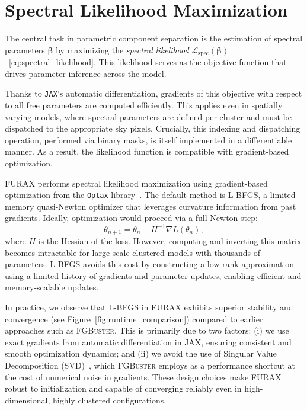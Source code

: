 \documentclass[%
 reprint,
bibnotes,
 amsmath,amssymb,
 aps,
floatfix, 
]{revtex4-2}
\begin{document}
\section{Spectral Likelihood Maximization}

The central task in parametric component separation is the estimation of spectral parameters \( \boldsymbol{\beta} \) by maximizing the \textit{spectral likelihood} \( \mathcal{L}_{\mathrm{spec}}(\boldsymbol{\beta}) \)~\eqref{eq:spectral_likelihood}. This likelihood serves as the objective function that drives parameter inference across the model.

Thanks to \texttt{JAX}'s automatic differentiation, gradients of this objective with respect to all free parameters are computed efficiently. This applies even in spatially varying models, where spectral parameters are defined per cluster and must be dispatched to the appropriate sky pixels. Crucially, this indexing and dispatching operation, performed via binary masks, is itself implemented in a differentiable manner. As a result, the likelihood function is compatible with gradient-based optimization.

\textsc{FURAX} performs spectral likelihood maximization using gradient-based optimization from the \texttt{Optax} library~\citep{optax}. The default method is L-BFGS, a limited-memory quasi-Newton optimizer that leverages curvature information from past gradients. Ideally, optimization would proceed via a full Newton step:
\begin{equation}
    \theta_{n+1} = \theta_n - H^{-1} \nabla L(\theta_n),
\end{equation}
where \( H \) is the Hessian of the loss. However, computing and inverting this matrix becomes intractable for large-scale clustered models with thousands of parameters. L-BFGS avoids this cost by constructing a low-rank approximation using a limited history of gradients and parameter updates, enabling efficient and memory-scalable updates.

In practice, we observe that L-BFGS in \textsc{FURAX} exhibits superior stability and convergence (see Figure~\ref{fig:runtime_comparison}) compared to earlier approaches such as \textsc{FGBuster}. This is primarily due to two factors: (i) we use exact gradients from automatic differentiation in JAX, ensuring consistent and smooth optimization dynamics; and (ii) we avoid the use of Singular Value Decomposition (SVD)~\citep{SVD}, which \textsc{FGBuster} employs as a performance shortcut at the cost of numerical noise in gradients. These design choices make \textsc{FURAX} robust to initialization and capable of converging reliably even in high-dimensional, highly clustered configurations.
\end{document}

